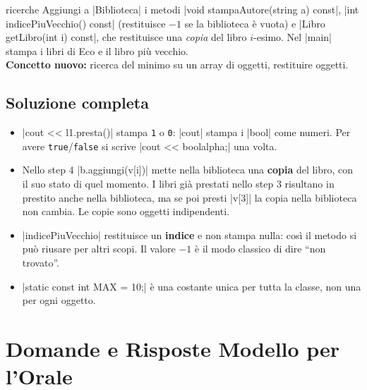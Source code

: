 \begin{step}{ricerche}
Aggiungi a \cc|Biblioteca| i metodi \cc|void stampaAutore(string a) const|,
\cc|int indicePiuVecchio() const| (restituisce $-1$ se la biblioteca è vuota) e
\cc|Libro getLibro(int i) const|, che restituisce una \emph{copia} del libro
$i$-esimo. Nel \cc|main| stampa i libri di Eco e il libro più vecchio.\\[0.3em]
\textbf{Concetto nuovo:} ricerca del minimo su un array di oggetti, restituire oggetti.
\end{step}

\subsection*{Soluzione completa}

\begin{consiglio}
\begin{itemize}
  \item \cc|cout << l1.presta()| stampa \texttt{1} o \texttt{0}: \cc|cout|
        stampa i \cc|bool| come numeri. Per avere \texttt{true}/\texttt{false}
        si scrive \cc|cout << boolalpha;| una volta.
  \item Nello step 4 \cc|b.aggiungi(v[i])| mette nella biblioteca una
        \textbf{copia} del libro, con il suo stato di quel momento. I libri già
        prestati nello step 3 risultano in prestito anche nella biblioteca,
        ma se poi presti \cc|v[3]| la copia nella biblioteca non cambia.
        Le copie sono oggetti indipendenti.
  \item \cc|indicePiuVecchio| restituisce un \textbf{indice} e non stampa nulla:
        così il metodo si può riusare per altri scopi. Il valore $-1$ è il modo
        classico di dire ``non trovato''.
  \item \cc|static const int MAX = 10;| è una costante unica per tutta la classe,
        non una per ogni oggetto.
\end{itemize}
\end{consiglio}

\section{Domande e Risposte Modello per l'Orale}

